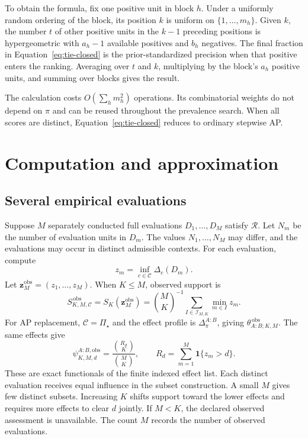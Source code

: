 \documentclass[11pt]{article}
\newcommand{\Regime}{\mathcal{R}}
\newcommand{\CSet}{\mathcal{C}}
\newcommand{\PSet}{\Pi_\star}
\theoremstyle{remark}
\begin{document}
To obtain the formula, fix one positive unit in block $h$. Under a uniformly random ordering of the block, its position $k$ is uniform on $\{1,\ldots,m_h\}$. Given $k$, the number $t$ of other positive units in the $k-1$ preceding positions is hypergeometric with $a_h-1$ available positives and $b_h$ negatives. The final fraction in Equation~\eqref{eq:tie-closed} is the prior-standardized precision when that positive enters the ranking. Averaging over $t$ and $k$, multiplying by the block's $a_h$ positive units, and summing over blocks gives the result.

The calculation costs $O(\sum_hm_h^2)$ operations. Its combinatorial weights do not depend on $\pi$ and can be reused throughout the prevalence search. When all scores are distinct, Equation~\eqref{eq:tie-closed} reduces to ordinary stepwise AP.

\section{Computation and approximation}
\label{app:computation}

\subsection{Several empirical evaluations}
\label{app:empirical-evaluations}

Suppose $M$ separately conducted full evaluations $D_1,\ldots,D_M$ satisfy $\Regime$. Let $N_m$ be the number of evaluation units in $D_m$. The values $N_1,\ldots,N_M$ may differ, and the evaluations may occur in distinct admissible contexts. For each evaluation, compute
\[
z_m
=
\inf_{c\in\CSet}\Delta_c(D_m).
\]
Let $\mathbf z_M^{\mathrm{obs}}=(z_1,\ldots,z_M)$. When $K\leq M$,
observed support is
\begin{equation}
S_{K,M,\CSet}^{\,\mathrm{obs}}
=
S_K(\mathbf z_M^{\mathrm{obs}})
=
\binom{M}{K}^{-1}
\sum_{I\in\mathcal I_{M,K}}
\min_{m\in I}z_m.
\label{eq:observed-empirical-support}
\end{equation}
For AP replacement, $\CSet=\PSet$ and the effect profile is $\Delta^{A:B}_\pi$, giving $\theta_{A:B;K,M}^{\,\mathrm{obs}}$. The same effects give
\begin{equation}
\psi_{K,M,d}^{A:B,\mathrm{obs}}
=
\frac{\binom{R_d}{K}}{\binom{M}{K}},
\qquad
R_d=\sum_{m=1}^M\mathbf 1\{z_m>d\}.
\label{eq:literal-survival-estimator}
\end{equation}
These are exact functionals of the finite indexed effect list. Each distinct
evaluation receives equal influence in the subset construction. A small $M$
gives few distinct subsets. Increasing $K$ shifts support toward the lower
effects and requires more effects to clear $d$ jointly. If $M<K$, the declared
observed assessment is unavailable. The count $M$ records the number of
observed evaluations.
\end{document}
